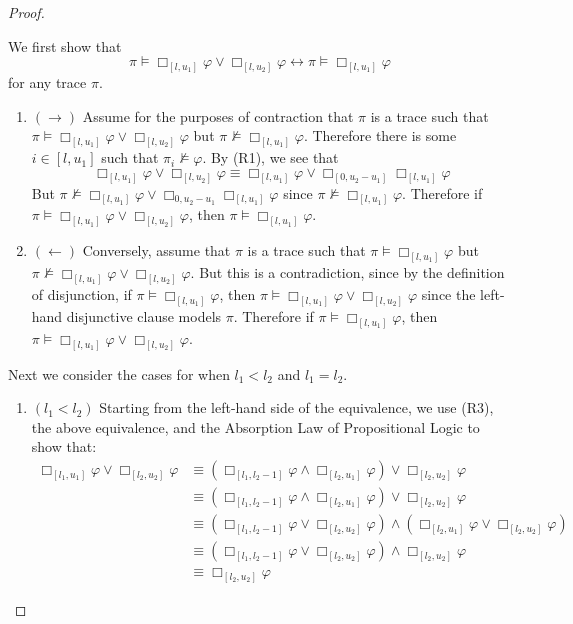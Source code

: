 \documentclass{article}
\begin{document}
\begin{proof}
\begin{enumerate}
We first show that 
$$
    \pi \models \Box_{[l,u_1]}{\varphi} \lor \Box_{[l,u_2]}{\varphi} \leftrightarrow \pi \models \Box_{[l,u_1]}{\varphi}
$$ 
for any trace $\pi$.
    \begin{enumerate}
    \item  $(\rightarrow)$
        Assume for the purposes of contraction that $\pi$ is a trace such that $\pi \models \Box_{[l,u_1]}{\varphi} \lor \Box_{[l,u_2]}{\varphi}$ but $\pi \nvDash \Box_{[l,u_1]}{\varphi}$. 
        Therefore there is some $i \in [l,u_1]$ such that $\pi_i \nvDash \varphi$. 
        By (R1), we see that
        $$
        \Box_{[l,u_1]}{\varphi} \lor \Box_{[l,u_2]}{\varphi} \equiv \Box_{[l,u_1]}{\varphi} \lor \Box_{[0,u_2-u_1]}{\Box_{[l,u_1]}{\varphi}}
        $$
        But $\pi \nvDash \Box_{[l,u_1]}{\varphi} \lor \Box_{0,u_2-u_1}{\Box_{[l,u_1]}{\varphi}}$ since $\pi \nvDash \Box_{[l,u_1]}{\varphi}$. 
        Therefore if $\pi \models \Box_{[l,u_1]}{\varphi} \lor \Box_{[l,u_2]}{\varphi}$, then $\pi \models \Box_{[l,u_1]}{\varphi}$.
    
    \item  $(\leftarrow)$
        Conversely, assume that $\pi$ is a trace such that $\pi \models \Box_{[l,u_1]}{\varphi}$ but $\pi \nvDash \Box_{[l,u_1]}{\varphi} \lor \Box_{[l,u_2]}{\varphi}$. 
        But this is a contradiction, since by the definition of disjunction, if $\pi \models \Box_{[l,u_1]}{\varphi}$, then $\pi \models \Box_{[l,u_1]}{\varphi} \lor \Box_{[l,u_2]}{\varphi}$ since the left-hand disjunctive clause models $\pi$.
        Therefore if $\pi \models \Box_{[l,u_1]}{\varphi}$, then $\pi \models \Box_{[l,u_1]}{\varphi} \lor \Box_{[l,u_2]}{\varphi}$.
    
    \end{enumerate}
Next we consider the cases for when $l_1 < l_2$ and $l_1 = l_2$.
    \begin{enumerate}
    \item  $(l_1 < l_2)$
        Starting from the left-hand side of the equivalence, we use (R3), the above equivalence, and the Absorption Law of Propositional Logic to show that:
        \begin{align*}
            \Box_{[l_1,u_1]}{\varphi} \lor \Box_{[l_2,u_2]}{\varphi} & \equiv (\Box_{[l_1,l_2-1]}{\varphi} \land \Box_{[l_2,u_1]}{\varphi}) \lor \Box_{[l_2,u_2]}{\varphi} \\
            & \equiv (\Box_{[l_1,l_2-1]}{\varphi} \land \Box_{[l_2,u_1]}{\varphi}) \lor \Box_{[l_2,u_2]}{\varphi} \\
            & \equiv (\Box_{[l_1,l_2-1]}{\varphi} \lor \Box_{[l_2,u_2]}{\varphi}) \land (\Box_{[l_2,u_1]}{\varphi} \lor \Box_{[l_2,u_2]}{\varphi}) \\
            & \equiv (\Box_{[l_1,l_2-1]}{\varphi} \lor \Box_{[l_2,u_2]}{\varphi}) \land \Box_{[l_2,u_2]}{\varphi} \\
            & \equiv \Box_{[l_2,u_2]}{\varphi}
        \end{align*}
    

\end{enumerate}
\end{enumerate}
\end{proof}
\end{document}
